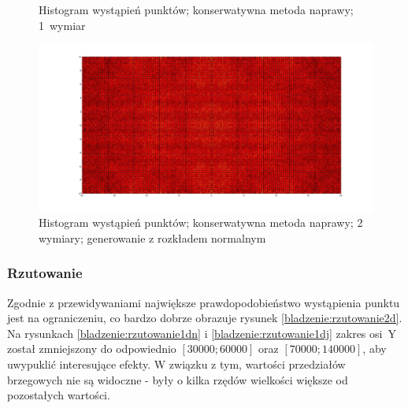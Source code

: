 \documentclass{mini}
\begin{document}
\begin{figure}[H]
\centering
{}
\quad
{}
\caption{Histogram wystąpień punktów; konserwatywna metoda naprawy; 1~wymiar}
\end{figure}

\begin{figure}[H]
\centering
\includegraphics[width=\textwidth]{c_n_10M_2__20_20__10_10_4}
\caption{Histogram wystąpień punktów; konserwatywna metoda naprawy; 2 wymiary; generowanie z rozkładem normalnym}
\end{figure}

\subsubsection*{Rzutowanie}
\hspace{3,4ex}Zgodnie z przewidywaniami największe prawdopodobieństwo wystąpienia punktu jest na ograniczeniu, co bardzo dobrze obrazuje rysunek \ref{bladzenie:rzutowanie2d}. Na rysunkach \ref{bladzenie:rzutowanie1dn} i \ref{bladzenie:rzutowanie1dj} zakres osi~Y został zmniejszony do odpowiednio $[30000;60000]$ oraz $[70000;140000]$, aby uwypuklić interesujące efekty. W związku z tym, wartości przedziałów brzegowych nie są widoczne - były o kilka rzędów wielkości większe od pozostałych wartości.
\end{document}
